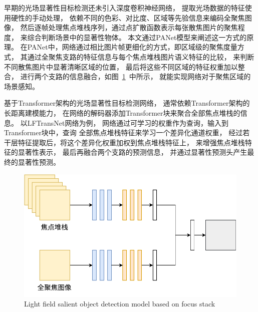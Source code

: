 

早期的光场显著性目标检测还未引入深度卷积神经网络，
提取光场数据的特征使用硬性的手动处理，
依赖不同的色彩、对比度、区域等先验信息来编码全聚焦图像，
然后逐帧处理焦点堆栈序列，通过点扩散函数表示每张散焦图片的聚焦程度，
来综合判断场景中的显著性物体。
本文通过PANet模型来阐述这一方式的原理。
在PANet中，网络通过相比图片帧更细化的方式，即区域级的聚焦度量方式，
其通过全聚焦支路的特征信息与每个焦点堆栈图片语义特征的比较，
来判断不同散焦图片中显著清晰区域的位置，
最后将这些不同区域的特征权重加以整合，
进行两个支路的信息融合，如图~\ref{cpt2_fig9:model_of_fs_inputs}~中所示，
就能实现网络对于聚焦区域的场景感知。






基于Transformer架构的光场显著性目标检测网络，
通常依赖Transformer架构的长距离建模能力，
在网络的解码器添加Transformer块来聚合全部焦点堆栈的信息。
以LFTransNet网络为例，
网络通过可学习的权重作为查询，输入到Transformer块中，查询
全部焦点堆栈特征来学习一个差异化通道权重，
经过若干层特征提取后，将这个差异化权重加权到焦点堆栈特征上，
来增强焦点堆栈特征的显著性表示，
最后再融合两个支路的预测信息，
并通过显著性预测头产生最终的显著性预测。








\begin{figure}[t]
	\centering
	\includegraphics[width=0.70\linewidth]{figures/chapter2/model_of_fs_inputs}
	{Light field salient object detection model based on focus stack}  
	\label{cpt2_fig9:model_of_fs_inputs}
\end{figure}



